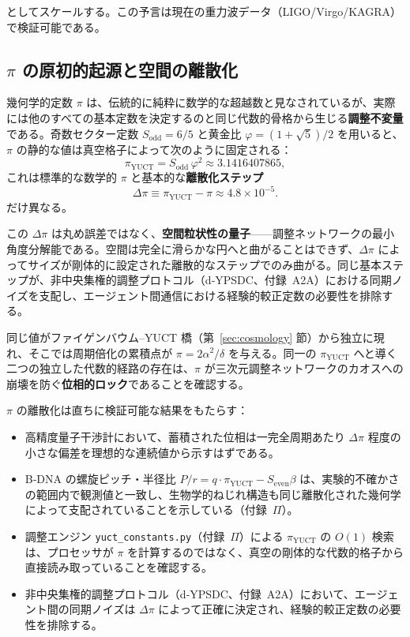 \documentclass[12pt,a4paper]{article}
\theoremstyle{remark}
\begin{document}
	としてスケールする。この予言は現在の重力波データ（LIGO/Virgo/KAGRA）で検証可能である。
	
	\subsection{\(\pi\) の原初的起源と空間の離散化}
	
	幾何学的定数 \(\pi\) は、伝統的に純粋に数学的な超越数と見なされているが、実際には他のすべての基本定数を決定するのと同じ代数的骨格から生じる\textbf{調整不変量}である。奇数セクター定数 \(S_{\mathrm{odd}}=6/5\) と黄金比 \(\varphi = (1+\sqrt{5})/2\) を用いると、\(\pi\) の静的な値は真空格子によって次のように固定される：
	\[
	\boxed{\pi_{\mathrm{YUCT}} = S_{\mathrm{odd}}\,\varphi^{2}
		\approx 3.1416407865},
	\]
	これは標準的な数学的 \(\pi\) と基本的な\textbf{離散化ステップ}
	\[
	\Delta\pi \equiv \pi_{\mathrm{YUCT}} - \pi \approx 4.8 \times 10^{-5}.
	\]
	だけ異なる。
	
	この \(\Delta\pi\) は丸め誤差ではなく、\textbf{空間粒状性の量子}——調整ネットワークの最小角度分解能である。空間は完全に滑らかな円へと曲がることはできず、\(\Delta\pi\) によってサイズが剛体的に設定された離散的なステップでのみ曲がる。同じ基本ステップが、非中央集権的調整プロトコル（d‑YPSDC、付録~A2A）における同期ノイズを支配し、エージェント間通信における経験的較正定数の必要性を排除する。
	
	同じ値がファイゲンバウム–YUCT 橋（第~\ref{sec:cosmology} 節）から独立に現れ、そこでは周期倍化の累積点が \(\pi = 2\alpha^2/\delta\) を与える。同一の \(\pi_{\mathrm{YUCT}}\) へと導く二つの独立した代数的経路の存在は、\(\pi\) が三次元調整ネットワークのカオスへの崩壊を防ぐ\textbf{位相的ロック}であることを確認する。
	
	\(\pi\) の離散化は直ちに検証可能な結果をもたらす：
	\begin{itemize}
		\item 高精度量子干渉計において、蓄積された位相は一完全周期あたり \(\Delta\pi\) 程度の小さな偏差を理想的な連続値から示すはずである。
		\item B‑DNA の螺旋ピッチ・半径比 \(P/r = q\cdot\pi_{\mathrm{YUCT}} - S_{\mathrm{even}}\beta\) は、実験的不確かさの範囲内で観測値と一致し、生物学的ねじれ構造も同じ離散化された幾何学によって支配されていることを示している（付録~\(\Pi\)）。
		\item 調整エンジン \texttt{yuct\_constants.py}（付録~\(\Pi\)）による \(\pi_{\mathrm{YUCT}}\) の \(O(1)\) 検索は、プロセッサが \(\pi\) を計算するのではなく、真空の剛体的な代数的格子から直接読み取っていることを確認する。
		\item 非中央集権的調整プロトコル（d‑YPSDC、付録~A2A）において、エージェント間の同期ノイズは \(\Delta\pi\) によって正確に決定され、経験的較正定数の必要性を排除する。
	\end{itemize}
	
\end{document}
